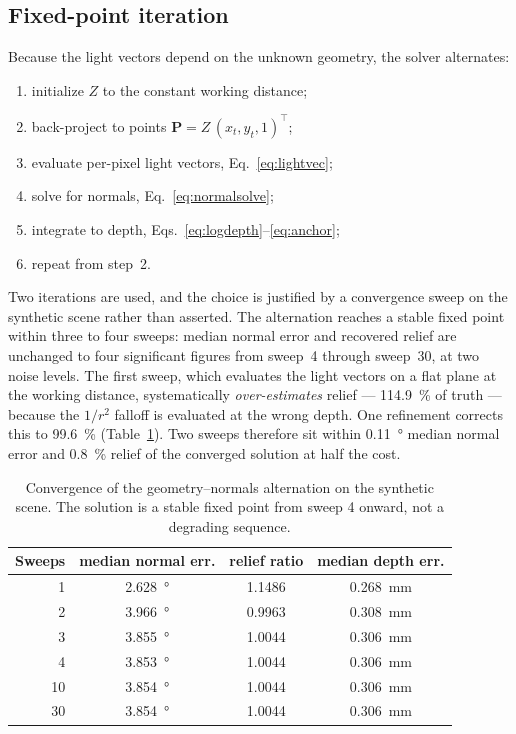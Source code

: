 \documentclass[journal,10pt]{IEEEtran}
\newcommand{\vecP}{\bm{P}}
\begin{document}
\subsection{Fixed-point iteration}\label{sec:iterate}
Because the light vectors depend on the unknown geometry, the solver alternates:
\begin{enumerate}
\item initialize $Z$ to the constant working distance;
\item back-project to points $\vecP = Z\,(x_t,y_t,1)^\top$;
\item evaluate per-pixel light vectors, Eq.~\eqref{eq:lightvec};
\item solve for normals, Eq.~\eqref{eq:normalsolve};
\item integrate to depth, Eqs.~\eqref{eq:logdepth}--\eqref{eq:anchor};
\item repeat from step~2.
\end{enumerate}
Two iterations are used, and the choice is justified by a convergence sweep on
the synthetic scene rather than asserted. The alternation reaches a stable fixed
point within three to four sweeps: median normal error and recovered relief are
unchanged to four significant figures from sweep~4 through sweep~30, at two noise
levels. The first sweep, which evaluates the light vectors on a flat plane at the
working distance, systematically \emph{over-estimates} relief --- \SI{114.9}{
\percent} of truth --- because the $1/r^2$ falloff is evaluated at the wrong
depth. One refinement corrects this to \SI{99.6}{\percent}
(Table~\ref{tab:converge}). Two sweeps therefore sit within \SI{0.11}{\degree}
median normal error and \SI{0.8}{\percent} relief of the converged solution at
half the cost.

\begin{table}[t]
\centering
\caption{Convergence of the geometry--normals alternation on the synthetic
scene. The solution is a stable fixed point from sweep 4 onward, not a
degrading sequence.}
\label{tab:converge}
\footnotesize
\begin{tabular}{@{}rccc@{}}
\toprule
\textbf{Sweeps} & \textbf{median normal err.} & \textbf{relief ratio} &
\textbf{median depth err.} \\
\midrule
1  & \SI{2.628}{\degree} & 1.1486 & \SI{0.268}{\milli\metre} \\
2  & \SI{3.966}{\degree} & 0.9963 & \SI{0.308}{\milli\metre} \\
3  & \SI{3.855}{\degree} & 1.0044 & \SI{0.306}{\milli\metre} \\
4  & \SI{3.853}{\degree} & 1.0044 & \SI{0.306}{\milli\metre} \\
10 & \SI{3.854}{\degree} & 1.0044 & \SI{0.306}{\milli\metre} \\
30 & \SI{3.854}{\degree} & 1.0044 & \SI{0.306}{\milli\metre} \\
\bottomrule
\end{tabular}
\end{table}
\end{document}
